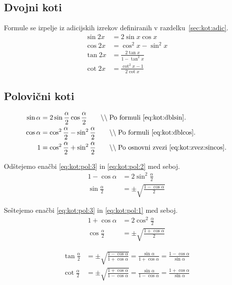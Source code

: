 \documentclass[a4paper,oneside,12pt,fleqn]{article}
\newcommand{\comment}[1]{\ensuremath{\qquad\backslash\backslash\;}\textnormal{#1}}
\def\kos{\cos}
\numberwithin{equation}{section}
\begin{document}
\subsection{Dvojni koti}
Formule se izpelje iz adicijskih izrekov definiranih v razdelku~\ref{sec:kot:adic}.
\begin{align}
  \sin2x &= 2\sin{x}\kos{x} \label{eq:kot:dblsin} \\
  \kos2x &= \kos^2x - \sin^2x \label{eq:kot:dblcos} \\
  \tan2x &= \frac{2\tan{x}}{1-\tan^2x} \nonumber \\
  \cot2x &= \frac{\cot^2x-1}{2\cot{x}} \nonumber
\end{align}

\subsection{Polovični koti}
\label{sec:kot:polov}

\begin{align}
  \sin\alpha &= 2\sin\frac{\alpha}{2}\kos\frac{\alpha}{2}
  \comment{Po formuli \eqref{eq:kot:dblsin}.} \label{eq:kot:pol:1} \\
  \kos\alpha &= \kos^2\frac{\alpha}{2} - \sin^2\frac{\alpha}{2}
  \comment{Po formuli \eqref{eq:kot:dblcos}.} \label{eq:kot:pol:2} \\
  1 &= \kos^2\frac{\alpha}{2} + \sin^2\frac{\alpha}{2}
  \comment{Po osnovni zvezi \eqref{eq:kot:zvez:sincos}.} \label{eq:kot:pol:3}
\end{align}

Odštejemo enačbi \eqref{eq:kot:pol:3} in \eqref{eq:kot:pol:2} med seboj.
\begin{align*}
  1 - \kos\alpha &= 2\sin^2\frac{\alpha}{2} \\
  \sin\frac{\alpha}{2} &= \pm\sqrt{\frac{1-\kos\alpha}{2}}
\end{align*}

Seštejemo enačbi \eqref{eq:kot:pol:3} in \eqref{eq:kot:pol:1} med seboj.
\begin{align*}
  1 + \kos\alpha &= 2\kos^2\frac{\alpha}{2} \\
  \kos\frac{\alpha}{2} &= \pm\sqrt{\frac{1+\kos\alpha}{2}}
\end{align*}

\begin{align*}
  \tan\frac{\alpha}{2} &= \pm\sqrt{\frac{1-\kos\alpha}{1+\kos\alpha}} =
  \frac{\sin\alpha}{1+\kos\alpha} = \frac{1-\kos\alpha}{\sin\alpha} \\
  \cot\frac{\alpha}{2} &= \pm\sqrt{\frac{1+\kos\alpha}{1-\kos\alpha}} =
  \frac{\sin\alpha}{1-\kos\alpha} = \frac{1+\kos\alpha}{\sin\alpha} \\
\end{align*}
\end{document}
